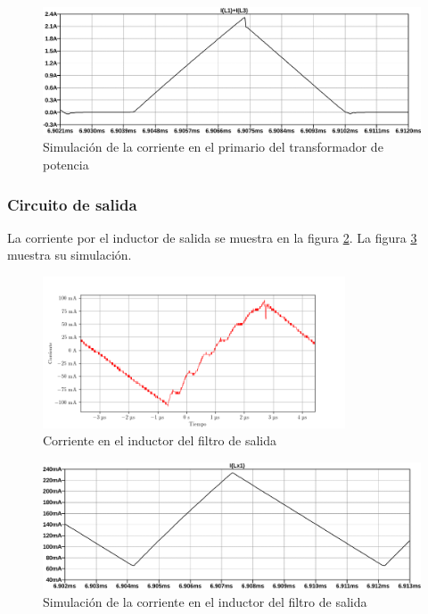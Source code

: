 \begin{figure}[H]
    \centering
    \includegraphics[width=\textwidth]{images/sim/12.pdf}
    \caption{Simulación de la corriente en el primario del transformador de potencia}
    \label{fig:sim:12}
\end{figure}

\subsubsection{Circuito de salida}

La corriente por el inductor de salida se muestra en la figura \ref{fig:osc:66}. La figura \ref{fig:sim:13} muestra su simulación.

\begin{figure}[H]
    \centering
    \includegraphics[width=0.8\textwidth]{images/capturas-osciloscopio/17-11-2022/66.png}
    \caption{Corriente en el inductor del filtro de salida}
    \label{fig:osc:66}
\end{figure}

\begin{figure}[H]
    \centering
    \includegraphics[width=\textwidth]{images/sim/13.pdf}
    \caption{Simulación de la corriente en el inductor del filtro de salida}
    \label{fig:sim:13}
\end{figure}

